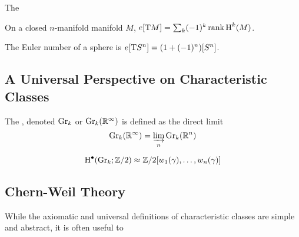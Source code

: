 \begin{definition}\label{sec:euler-class}
	The 
\end{definition}

\begin{proposition}
	On a closed $n$-manifold manifold $M$, $e[\mathrm{T} M]=\sum_k (-1)^k \operatorname{rank} \operatorname{H}^k(M)$.
\end{proposition}

\begin{corollary}
	The Euler number of a sphere is $e[\mathrm{T} S^n] = (1+(-1)^n)[S^n]$.
\end{corollary}

\subsection{A Universal Perspective on Characteristic Classes}\label{sec:universal-characteristic-classes}

\begin{definition}
	The , denoted $\mathrm{Gr}_k$ or $\mathrm{Gr}_k(\mathbb{R}^\infty)$ is defined as the direct limit
	\[
		\mathrm{Gr}_k(\mathbb{R}^\infty) = \varinjlim_n \mathrm{Gr}_k(\mathbb{R}^n)
	\]
\end{definition}

\begin{theorem}
	\[
		\operatorname{H}^\bullet(\mathrm{Gr}_k; \mathbb{Z}/2) \approx \mathbb{Z}/2[w_1(\gamma), \ldots, w_n(\gamma)]
	\]
\end{theorem}

\subsection{Chern-Weil Theory}\label{sec:chern-weil-theory}

While the axiomatic and universal definitions of characteristic classes are simple and abstract, it is often useful to
